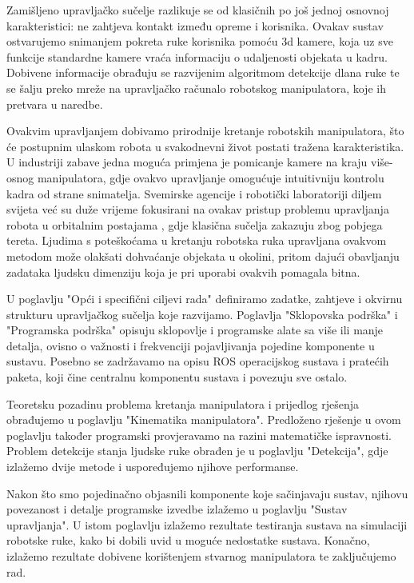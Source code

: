 \documentclass[times, utf8, diplomski, numeric]{fer}
\begin{document}
Zamišljeno upravljačko sučelje razlikuje se od klasičnih po još jednoj osnovnoj karakteristici: ne zahtjeva kontakt između opreme i korisnika.
Ovakav sustav ostvarujemo snimanjem pokreta ruke korisnika pomoću 3d kamere, koja uz sve funkcije standardne kamere vraća informaciju o udaljenosti objekata u kadru.
Dobivene informacije obrađuju se razvijenim algoritmom detekcije dlana ruke te se šalju preko mreže na upravljačko računalo robotskog manipulatora, koje ih pretvara u naredbe.

Ovakvim upravljanjem dobivamo prirodnije kretanje robotskih manipulatora, što će postupnim ulaskom robota u svakodnevni život postati tražena karakteristika.
U industriji zabave jedna moguća primjena je pomicanje kamere na kraju više-osnog manipulatora, gdje ovakvo upravljanje omogućuje intuitivniju kontrolu kadra od strane snimatelja.
Svemirske agencije i robotički laboratoriji diljem svijeta već su duže vrijeme fokusirani na ovakav pristup problemu upravljanja robota u orbitalnim postajama \cite{yoshida2009achievements} \cite{larson1999human}, gdje klasična sučelja zakazuju zbog pobjega tereta.
Ljudima s poteškoćama u kretanju robotska ruka upravljana ovakvom metodom može olakšati dohvaćanje objekata u okolini, pritom dajući obavljanju zadataka ljudsku dimenziju koja je pri uporabi ovakvih pomagala bitna.

U poglavlju "Opći i specifični ciljevi rada" definiramo zadatke, zahtjeve i okvirnu strukturu upravljačkog sučelja koje razvijamo.
Poglavlja "Sklopovska podrška" i "Programska podrška" opisuju sklopovlje i programske alate sa više ili manje detalja, ovisno o važnosti i frekvenciji pojavljivanja pojedine komponente u sustavu.
Posebno se zadržavamo na opisu ROS operacijskog sustava i pratećih paketa, koji čine centralnu komponentu sustava i povezuju sve ostalo.

Teoretsku pozadinu problema kretanja manipulatora i prijedlog rješenja obrađujemo u poglavlju "Kinematika manipulatora".
Predloženo rješenje u ovom poglavlju također programski provjeravamo na razini matematičke ispravnosti.
Problem detekcije stanja ljudske ruke obrađen je u poglavlju "Detekcija", gdje izlažemo dvije metode i uspoređujemo njihove performanse.

Nakon što smo pojedinačno objasnili komponente koje sačinjavaju sustav, njihovu povezanost i detalje programske izvedbe izlažemo u poglavlju "Sustav upravljanja".
U istom poglavlju izlažemo rezultate testiranja sustava na simulaciji robotske ruke, kako bi dobili uvid u moguće nedostatke sustava.
Konačno, izlažemo rezultate dobivene korištenjem stvarnog manipulatora te zaključujemo rad.
\end{document}
